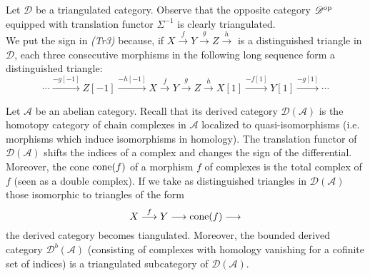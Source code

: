 \begin{defn}
\begin{enumerate}
\begin{center}
\end{center}
\end{enumerate}
\end{defn}

Let $\mathscr{D}$ be a triangulated category. Observe that the opposite category $\mathscr{D}^{\textnormal{op}}$ equipped with translation functor $\Sigma^{-1}$ is clearly triangulated.\\
We put the sign in \textit{(Tr3)} because, if $X \overset{f}{\longrightarrow} Y \overset{g}{\longrightarrow} Z \overset{h}{\longrightarrow} $ is a distinguished triangle in $\mathscr{D}$, each three consecutive morphisms in the following long sequence form a distinguished triangle: $$\cdots \overset{-g[-1]}{\longrightarrow} Z[-1] \overset{-h[-1]}{\longrightarrow} X \overset{f}{\longrightarrow} Y \overset{g}{\longrightarrow} Z \overset{h}{\longrightarrow} X[1] \overset{-f[1]}{\longrightarrow} Y[1] \overset{-g[1]}{\longrightarrow} \cdots$$ 

\begin{exmp}\label{bbe}
Let $\mathscr{A}$ be an abelian category. Recall that its derived category $\mathscr{D}(\mathscr{A})$ is the homotopy category of chain complexes in $\mathscr{A}$ localized to quasi-isomorphisms (i.e. morphisms which induce isomorphisms in homology). The translation functor of $\mathscr{D}(\mathscr{A})$ shifts the indices of a complex and changes the sign of the differential. Moreover, the cone $\textnormal{cone}(f)$ of a morphism $f$ of complexes is the total complex of $f$ (seen as a double complex). If we take as distinguished triangles in $\mathscr{D}(\mathscr{A})$ those isomorphic to triangles of the form $$X \overset{f}{\longrightarrow} Y \longrightarrow \textnormal{cone}(f) \longrightarrow$$
the derived category becomes tiangulated. Moreover, the bounded derived category $\mathscr{D}^b(\mathscr{A})$ (consisting of complexes with homology vanishing for a cofinite set of indices) is a triangulated subcategory of $\mathscr{D}(\mathscr{A})$. 
\end{exmp}

